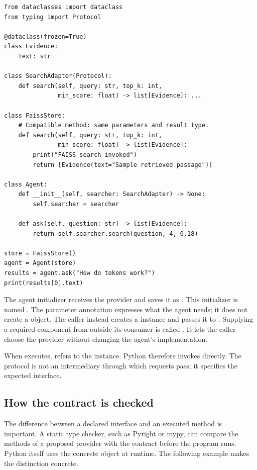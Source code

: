 \begin{lstlisting}[caption={Supplying a concrete search provider to the agent},label={lst:concrete-provider}]
from dataclasses import dataclass
from typing import Protocol

@dataclass(frozen=True)
class Evidence:
    text: str

class SearchAdapter(Protocol):
    def search(self, query: str, top_k: int,
               min_score: float) -> list[Evidence]: ...

class FaissStore:
    # Compatible method: same parameters and result type.
    def search(self, query: str, top_k: int,
               min_score: float) -> list[Evidence]:
        print("FAISS search invoked")
        return [Evidence(text="Sample retrieved passage")]

class Agent:
    def __init__(self, searcher: SearchAdapter) -> None:
        self.searcher = searcher

    def ask(self, question: str) -> list[Evidence]:
        return self.searcher.search(question, 4, 0.18)

store = FaissStore()
agent = Agent(store)
results = agent.ask("How do tokens work?")
print(results[0].text)
\end{lstlisting}

The agent initializer receives the provider and saves it as . This initializer is named . The parameter annotation   expresses what the agent needs; it does not create a  object. The caller instead creates a  instance and passes it to . Supplying a required component from outside its consumer is called . It lets the caller choose the provider without changing the agent's implementation.

When  executes,  refers to the  instance. Python therefore invokes  directly. The protocol is not an intermediary through which requests pass; it specifies the expected interface.

\subsection{How the contract is checked}
The difference between a declared interface and an executed method is important. A static type checker, such as Pyright or mypy, can compare the methods of a proposed provider with the  contract before the program runs. Python itself uses the concrete object at runtime. The following example makes the distinction concrete.

